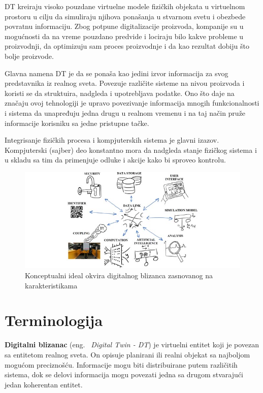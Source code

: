 \documentclass[a4paper]{article}
\begin{document}
{DT kreiraju visoko pouzdane virtuelne modele fizičkih objekata u virtuelnom prostoru u cilju da
simuliraju njihova ponašanja u stvarnom svetu i obezbede povratnu informaciju. Zbog potpune
digitalizacije proizvoda, kompanije su u mogućnosti da na vreme pouzdano predvide i lociraju
bilo kakve probleme u proizvodnji, da optimizuju sam proces proizvodnje i da kao rezultat
dobiju što bolje proizvode.\cite{enablingtechnologies}

Glavna namena DT je da se ponaša kao jedini izvor informacija za svog predstavnika iz realnog
sveta. Povezuje različite sisteme na nivou proizvoda i koristi se da struktuira, nadgleda i
upotrebljava podatke. Ono što daje na značaju ovoj tehnologiji je upravo povezivanje
informacija mnogih funkcionalnosti i sistema da unapređuju jedna drugu u realnom vremenu i na
taj način pruže informacije korisniku sa jedne pristupne tačke.\cite{digitaltwins}

Integrisanje fizičkih procesa i kompjuterskih sistema je glavni izazov. Kompjuterski (sajber) deo
konstantno mora da nadgleda stanje fizičkog sistema i u skladu sa tim da primenjuje odluke i
akcije kako bi sproveo kontrolu.\cite{cyber}

\begin{figure}[h!]
	\begin{center}
		\includegraphics[scale=1.4]{3_access-gagraphic.jpg}
	\end{center}
	\caption{Konceptualni ideal okvira digitalnog blizanca
	zasnovanog na karakteristikama \cite{feature}}
\end{figure}

\section{Terminologija}
\label{sec:terminologija}

\textbf{Digitalni blizanac} (eng. ~{\em Digital Twin - DT}) je virtuelni entitet koji je povezan sa entitetom realnog sveta. On opisuje
planirani ili realni objekat sa najboljom mogućom preciznošću. Informacije mogu biti
distribuirane putem različitih sistema, dok se delovi informacija mogu povezati jedna sa drugom
stvarajući jedan koherentan entitet. \cite{feature}\\

}
\end{document}
